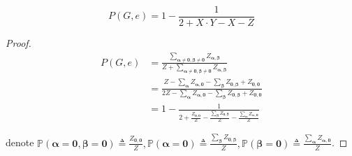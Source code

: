 \begin{lemma}
	
	\begin{equation}
	P(G,e) =  1 - \frac{1}{2 + X \cdot Y - X - Z}
		\label{recursion2}
	\end{equation}

\end{lemma}
\begin{proof}

	\begin{align*}
P(G,e) &= \frac{\sum_{\boldsymbol\alpha \neq \mathbf{0}, \boldsymbol\beta \neq \mathbf{0}} Z_{\boldsymbol\alpha, \boldsymbol\beta}}{Z + \sum_{\boldsymbol\alpha \neq \mathbf{0}, \boldsymbol\beta \neq \mathbf{0}} Z_{\boldsymbol\alpha, \boldsymbol\beta}} \\
&=\frac{Z - \sum_{\boldsymbol\alpha}Z_{\boldsymbol\alpha,\mathbf{0}} - \sum_{\boldsymbol\beta} Z_{\mathbf{0}, \boldsymbol\beta} + Z_{\mathbf{0}, \mathbf{0}}}{2Z - \sum_{\boldsymbol\alpha}Z_{\boldsymbol\alpha,\mathbf{0}} - \sum_{\boldsymbol\beta} Z_{\mathbf{0}, \boldsymbol\beta} + Z_{\mathbf{0}, \mathbf{0}}} \\
&= 1 - \frac{1}{2 + \frac{Z_{\mathbf{0},\mathbf{0}}}{Z} - \frac{\sum_{\boldsymbol\beta} Z_{\mathbf{0}, \boldsymbol\beta} }{Z} - \frac{\sum_{\boldsymbol\alpha} Z_{ \boldsymbol\alpha , \mathbf{0}} }{Z}}
	\end{align*}

	denote $\mathbb{P} \left( \boldsymbol\alpha = \mathbf{0}, \boldsymbol\beta = \mathbf{0} \right) \triangleq \frac{Z_{\mathbf{0},\mathbf{0}}}{Z}, \mathbb{P} \left( \boldsymbol\alpha = \mathbf{0} \right) \triangleq \frac{\sum_{\boldsymbol\beta} Z_{\mathbf{0}, \boldsymbol\beta} }{Z}, \mathbb{P} \left( \boldsymbol\beta = \mathbf{0} \right) \triangleq \frac{\sum_{\boldsymbol\alpha} Z_{ \boldsymbol\alpha , \mathbf{0}} }{Z}$.


\end{proof}
